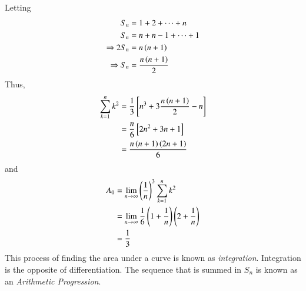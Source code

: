 \documentclass[journal,12pt,twocolumn]{IEEEtran}
\begin{document}
%
Letting
\begin{align}
S_n &= 1 + 2 + \dots +n
\\
S_n &= n + n-1 + \dots +1
\\
\Rightarrow 2S_n &= n\left(n+1\right)
\\
\Rightarrow S_n &= \frac{n\left(n+1\right)}{2}
\end{align}
Thus,
\begin{align}
\sum_{k=1}^{n}k^2 & = \frac{1}{3}{}\left[n^3 + 3 \frac{n\left(n+1\right)}{2} - n\right]
\\
& = \frac{n}{6}{}\left[2n^2 + 3n + 1\right]
\\
&=\frac{n\left(n+1\right)\left(2n+1\right)}{6}
\end{align}
and
\begin{align}
A_0 &= \lim_{n\to \infty}\left(\frac{1}{n}\right)^3\sum_{k=1}^{n}k^2 
\\
&= \lim_{n\to \infty}\frac{1}{6}\left(1+\frac{1}{n}\right)\left(2+\frac{1}{n}\right)
\\
&= \frac{1}{3}
\end{align}
%
This process of finding the area under a curve is known as {\em integration}.  Integration
is the opposite of differentiation. The sequence that is summed in $S_n$ is known as an 
{\em Arithmetic Progression}.
\end{document}
